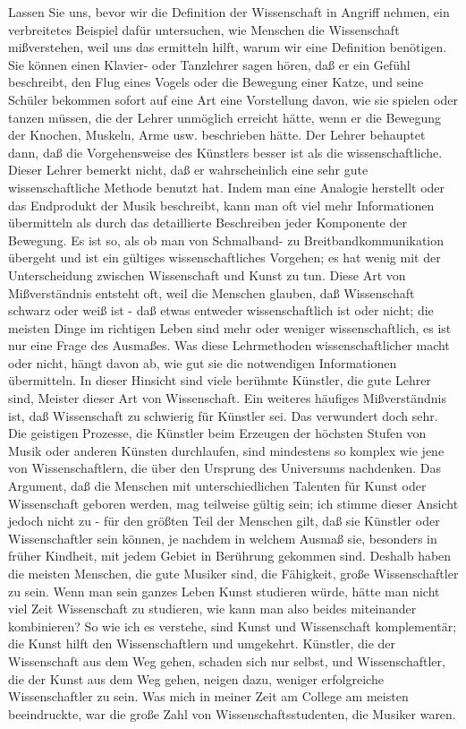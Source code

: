 Lassen Sie uns, bevor wir die Definition der Wissenschaft in Angriff nehmen, ein verbreitetes Beispiel dafür untersuchen, wie Menschen die Wissenschaft mißverstehen, weil uns das ermitteln hilft, warum wir eine Definition benötigen.
 Sie können einen Klavier- oder Tanzlehrer sagen hören, daß er ein Gefühl beschreibt, den Flug eines Vogels oder die Bewegung einer Katze, und seine Schüler bekommen sofort auf eine Art eine Vorstellung davon, wie sie spielen oder tanzen müssen, die der Lehrer unmöglich erreicht hätte, wenn er die Bewegung der Knochen, Muskeln, Arme usw. beschrieben hätte.
 Der Lehrer behauptet dann, daß die Vorgehensweise des Künstlers besser ist als die wissenschaftliche.
 Dieser Lehrer bemerkt nicht, daß er wahrscheinlich eine sehr gute wissenschaftliche Methode benutzt hat.
 Indem man eine Analogie herstellt oder das Endprodukt der Musik beschreibt, kann man oft viel mehr Informationen übermitteln als durch das detaillierte Beschreiben jeder Komponente der Bewegung.
 Es ist so, als ob man von Schmalband- zu Breitbandkommunikation übergeht und ist ein gültiges wissenschaftliches Vorgehen; es hat wenig mit der Unterscheidung zwischen Wissenschaft und Kunst zu tun.
 Diese Art von Mißverständnis entsteht oft, weil die Menschen glauben, daß Wissenschaft schwarz oder weiß ist - daß etwas entweder wissenschaftlich ist oder nicht; die meisten Dinge im richtigen Leben sind mehr oder weniger wissenschaftlich, es ist nur eine Frage des Ausmaßes.
 Was diese Lehrmethoden wissenschaftlicher macht oder nicht, hängt davon ab, wie gut sie die notwendigen Informationen übermitteln.
 In dieser Hinsicht sind viele berühmte Künstler, die gute Lehrer sind, Meister dieser Art von Wissenschaft.
 Ein weiteres häufiges Mißverständnis ist, daß Wissenschaft zu schwierig für Künstler sei.
 Das verwundert doch sehr.
 Die geistigen Prozesse, die Künstler beim Erzeugen der höchsten Stufen von Musik oder anderen Künsten durchlaufen, sind mindestens so komplex wie jene von Wissenschaftlern, die über den Ursprung des Universums nachdenken.
 Das Argument, daß die Menschen mit unterschiedlichen Talenten für Kunst oder Wissenschaft geboren werden, mag teilweise gültig sein; ich stimme dieser Ansicht jedoch nicht zu - für den größten Teil der Menschen gilt, daß sie Künstler oder Wissenschaftler sein können, je nachdem in welchem Ausmaß sie, besonders in früher Kindheit, mit jedem Gebiet in Berührung gekommen sind.
 Deshalb haben die meisten Menschen, die gute Musiker sind, die Fähigkeit, große Wissenschaftler zu sein.
 Wenn man sein ganzes Leben Kunst studieren würde, hätte man nicht viel Zeit Wissenschaft zu studieren, wie kann man also beides miteinander kombinieren?
 So wie ich es verstehe, sind Kunst und Wissenschaft komplementär; die Kunst hilft den Wissenschaftlern und umgekehrt.
 Künstler, die der Wissenschaft aus dem Weg gehen, schaden sich nur selbst, und Wissenschaftler, die der Kunst aus dem Weg gehen, neigen dazu, weniger erfolgreiche Wissenschaftler zu sein.
 Was mich in meiner Zeit am College am meisten beeindruckte, war die große Zahl von Wissenschaftsstudenten, die Musiker waren.
 

